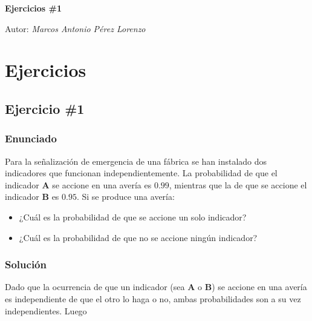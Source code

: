 \documentclass[12pt,a4paper]{article}
\begin{document}
\begin{titlepage}

  \centering
  {\huge\bfseries Ejercicios \#1\par}
	{\Large Autor: \itshape Marcos Antonio Pérez Lorenzo\par}
\end{titlepage}

\pagebreak

\section{Ejercicios}

\subsection{Ejercicio \#1}

\subsubsection{Enunciado}

Para la señalización de emergencia de una fábrica se han instalado dos indicadores que funcionan independientemente. La probabilidad de que el indicador \textbf{A} se accione en una avería es \(0.99\), mientras que la de que se accione el indicador \textbf{B} es \(0.95\). Si se produce una avería:
\begin{itemize}
  \item[a)] ¿Cuál es la probabilidad de que se accione un solo indicador?
  \item[b)] ¿Cuál es la probabilidad de que no se accione ningún indicador?
\end{itemize}

\subsubsection{Solución}

Dado que la ocurrencia de que un indicador (sea \textbf{A} o \textbf{B}) se accione en una avería es independiente de que el otro lo haga o no, ambas probabilidades son a su vez independientes. Luego
\end{document}
